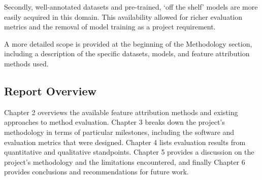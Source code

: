 \documentclass[main]{subfiles}
\begin{document}
Secondly, well-annotated datasets and pre-trained, `off the shelf' models are more easily acquired in this domain. This availability allowed for richer evaluation metrics and the removal of model training as a project requirement.

A more detailed scope is provided at the beginning of the Methodology section, including a description of the specific datasets, models, and feature attribution methods used.


\subsection*{Report Overview}

Chapter 2 overviews the available feature attribution methods and existing approaches to method evaluation. Chapter 3 breaks down the project's methodology in terms of particular milestones, including the software and evaluation metrics that were designed. Chapter 4 lists evaluation results from quantitative and qualitative standpoints. Chapter 5 provides a discussion on the project's methodology and the limitations encountered, and finally Chapter 6 provides conclusions and recommendations for future work. 
\end{document}
